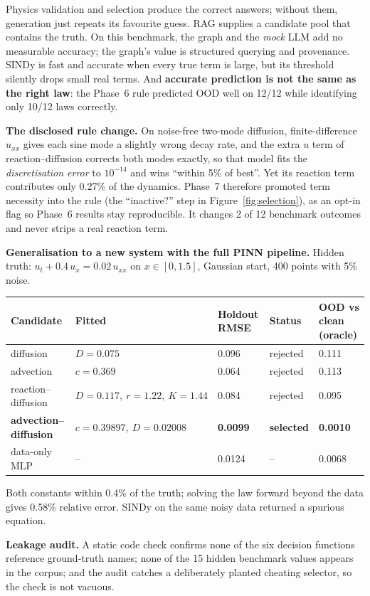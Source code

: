 \begin{lesson}
Physics validation and selection produce the correct answers; without them, generation just repeats its
favourite guess. RAG supplies a candidate pool that contains the truth. On this benchmark, the graph and the
\emph{mock} LLM add no measurable accuracy; the graph's value is structured querying and provenance. SINDy is
fast and accurate when every true term is large, but its threshold silently drops small real terms. And
\textbf{accurate prediction is not the same as the right law}: the Phase~6 rule predicted OOD well on 12/12 while
identifying only 10/12 laws correctly.
\end{lesson}

\textbf{The disclosed rule change.} On noise-free two-mode diffusion, finite-difference $u_{xx}$ gives each sine
mode a slightly wrong decay rate, and the extra $u$ term of reaction--diffusion corrects both modes exactly, so
that model fits the \emph{discretisation error} to $10^{-14}$ and wins ``within 5\% of best''. Yet its reaction
term contributes only 0.27\% of the dynamics. Phase~7 therefore promoted term necessity into the rule (the
``inactive?'' step in Figure~\ref{fig:selection}), as an opt-in flag so Phase~6 results stay reproducible. It
changes 2 of 12 benchmark outcomes and never strips a real reaction term.

\textbf{Generalisation to a new system with the full PINN pipeline.} Hidden truth:
$u_t + 0.4\,u_x = 0.02\,u_{xx}$ on $x\in[0,1.5]$, Gaussian start, 400 points with 5\% noise.
\begin{center}
\footnotesize\setlength{\tabcolsep}{4pt}
\begin{tabular}{@{}lllll@{}}
\toprule
\textbf{Candidate} & \textbf{Fitted} & \textbf{Holdout RMSE} & \textbf{Status} & \textbf{OOD vs clean (oracle)} \\ \midrule
diffusion & $D=0.075$ & 0.096 & rejected & 0.111 \\
advection & $c=0.369$ & 0.064 & rejected & 0.113 \\
reaction--diffusion & $D=0.117,\ r=1.22,\ K=1.44$ & 0.084 & rejected & 0.095 \\
\textbf{advection--diffusion} & $c=0.39897,\ D=0.02008$ & \textbf{0.0099} & \textbf{selected} & \textbf{0.0010} \\
data-only MLP & -- & 0.0124 & -- & 0.0068 \\
\bottomrule
\end{tabular}
\end{center}
Both constants within 0.4\% of the truth; solving the law forward beyond the data gives 0.58\% relative error.
SINDy on the same noisy data returned a spurious equation.

\textbf{Leakage audit.} A static code check confirms none of the six decision functions reference ground-truth
names; none of the 15 hidden benchmark values appears in the corpus; and the audit catches a deliberately planted
cheating selector, so the check is not vacuous.
